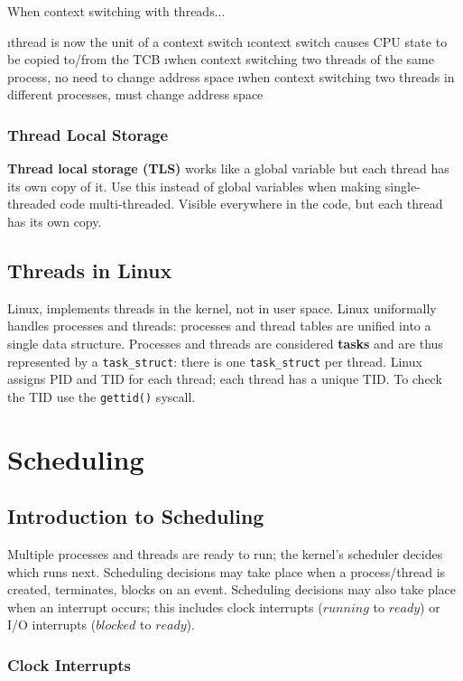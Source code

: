 \documentclass{article}
\begin{document}
    When context switching with threads...

    \bl
    \i thread is now the unit of a context switch
    \i context switch causes CPU state to be copied to/from the TCB
    \i when context switching two threads of the same process, no need to change address space
    \i when context switching two threads in different processes, must change address space 
    \el

    \subsubsection{Thread Local Storage}

    \textbf{Thread local storage (TLS)} works like a global variable but each thread has its own copy of it. Use this instead of global variables when making single-threaded code multi-threaded. Visible everywhere in the code, but each thread has its own copy. 

\subsection{Threads in Linux}

    Linux, implements threads in the kernel, not in user space. Linux uniformally handles processes and threads: processes and thread tables are unified into a single data structure. Processes and threads are considered \textbf{tasks} and are thus represented by a \texttt{task\_struct}: there is one \texttt{task\_struct} per thread. Linux assigns PID and TID for each thread; each thread has a unique TID. To check the TID use the \texttt{gettid()} syscall. 

\section{Scheduling}

\subsection{Introduction to Scheduling}

    Multiple processes and threads are ready to run; the kernel's scheduler decides which runs next. Scheduling decisions may take place when a process/thread is created, terminates, blocks on an event. Scheduling decisions may also take place when an interrupt occurs; this includes clock interrupts ($running$ to $ready$) or I/O interrupts ($blocked$ to $ready$). 

    \subsubsection{Clock Interrupts}
\end{document}
